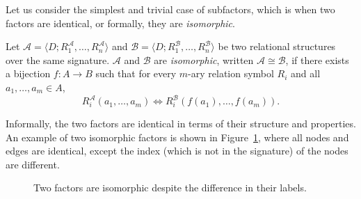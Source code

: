 Let us consider the simplest and trivial case of subfactors, which is when two factors are identical, or formally, they are \textit{isomorphic}. 

\begin{definition}[Isomorphism]
Let
$\mathcal{A} =
\langle D; R_1^{\mathcal{A}},\ldots,R_n^{\mathcal{A}}\rangle$
and
$
\mathcal{B} =
\langle D; R_1^{\mathcal{B}},\ldots,R_n^{\mathcal{B}}\rangle
$
be two relational structures over the same signature.
$\mathcal{A}$ and $\mathcal{B}$ are \emph{isomorphic}, written
$\mathcal{A} \cong \mathcal{B}$, if there exists a bijection
$f:A \to B$ such that for every $m$-ary relation symbol $R_i$ and all
$a_1,\ldots,a_m \in A$,
\[
R_i^{\mathcal{A}}(a_1,\ldots,a_m)
\Longleftrightarrow
R_i^{\mathcal{B}}(f(a_1),\ldots,f(a_m)).
\]
\end{definition}

Informally, the two factors are identical in terms of their structure 
and properties. An example of two isomorphic factors is shown in 
Figure~\ref{fig:isomorphic}, where all nodes and edges are identical,
except the index (which is not in the signature) of the nodes are different.


\begin{figure}[h]
		\centering
	\caption{Two factors are isomorphic despite the difference in their labels. }
    \label{fig:isomorphic}
\end{figure}



